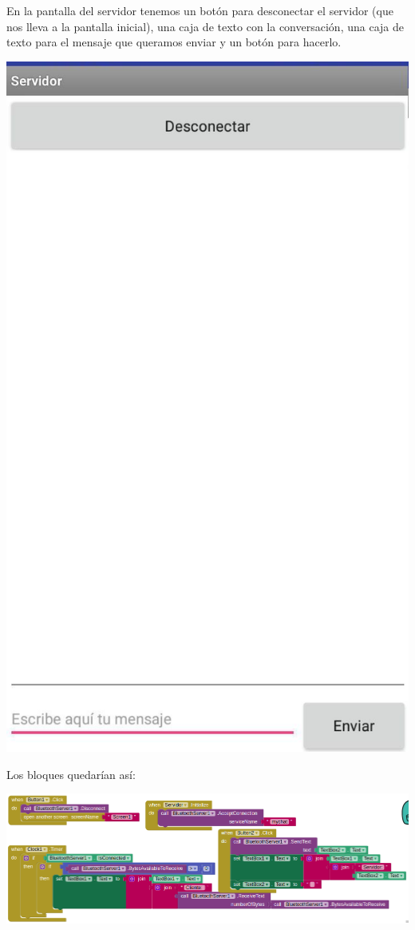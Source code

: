 \documentclass{article}
\begin{document}
En la pantalla del servidor tenemos un botón para desconectar el servidor (que nos lleva a la pantalla inicial), una caja de texto con la conversación, una caja de texto para el mensaje que queramos enviar y un botón para hacerlo.

\begin{flushleft}
	\includegraphics[scale=0.3]{imagenes/ServidorPantalla.jpg} 
\end{flushleft}

Los bloques quedarían así:

\begin{flushleft}
	\includegraphics[scale=0.4]{imagenes/Servidor.png} 
\end{flushleft}
\end{document}
